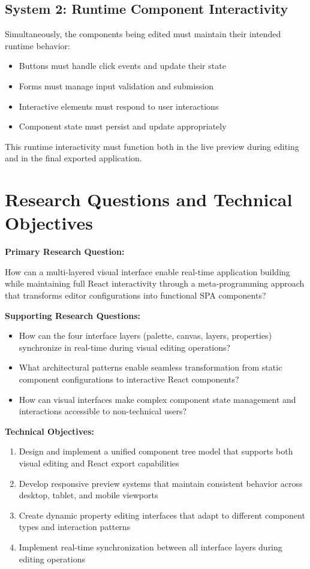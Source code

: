 \documentclass[oneside,11pt]{book}
\begin{document}
\subsection{System 2: Runtime Component Interactivity}
Simultaneously, the components being edited must maintain their intended runtime behavior:
\begin{itemize}
    \item Buttons must handle click events and update their state
    \item Forms must manage input validation and submission
    \item Interactive elements must respond to user interactions
    \item Component state must persist and update appropriately
\end{itemize}

This runtime interactivity must function both in the live preview during editing and in the final exported application.

\section{Research Questions and Technical Objectives}
\label{sec:research-objectives}

\textbf{Primary Research Question:}

How can a multi-layered visual interface enable real-time application building while maintaining full React interactivity through a meta-programming approach that transforms editor configurations into functional \gls{SPA} components?

\textbf{Supporting Research Questions:}

\begin{itemize}
    \item How can the four interface layers (palette, canvas, layers, properties) synchronize in real-time during visual editing operations?
    \item What architectural patterns enable seamless transformation from static component configurations to interactive React components?
    \item How can visual interfaces make complex component state management and interactions accessible to non-technical users?
\end{itemize}

\textbf{Technical Objectives:}

\begin{enumerate}
    \item Design and implement a unified component tree model that supports both visual editing and React export capabilities
    \item Develop responsive preview systems that maintain consistent behavior across desktop, tablet, and mobile viewports
    \item Create dynamic property editing interfaces that adapt to different component types and interaction patterns
    \item Implement real-time synchronization between all interface layers during editing operations
\end{enumerate}
\end{document}
